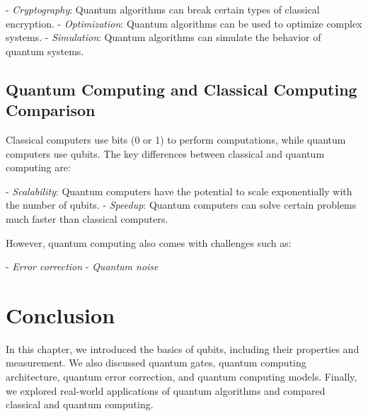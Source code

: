 - \textit{Cryptography}: Quantum algorithms can break certain types of classical encryption.
- \textit{Optimization}: Quantum algorithms can be used to optimize complex systems.
- \textit{Simulation}: Quantum algorithms can simulate the behavior of quantum systems.

\subsection{Quantum Computing and Classical Computing Comparison}

Classical computers use bits (0 or 1) to perform computations, while quantum computers use qubits. The key differences between classical and quantum computing are:

- \textit{Scalability}: Quantum computers have the potential to scale exponentially with the number of qubits.
- \textit{Speedup}: Quantum computers can solve certain problems much faster than classical computers.

However, quantum computing also comes with challenges such as:

- \textit{Error correction}
- \textit{Quantum noise}

\section{Conclusion}

In this chapter, we introduced the basics of qubits, including their properties and measurement. We also discussed quantum gates, quantum computing architecture, quantum error correction, and quantum computing models. Finally, we explored real-world applications of quantum algorithms and compared classical and quantum computing.